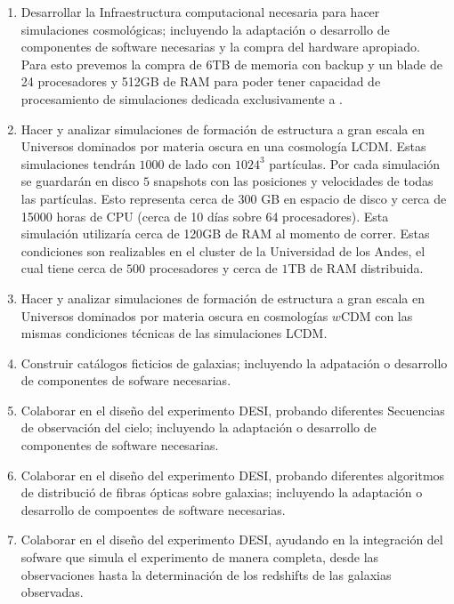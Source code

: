 \begin{enumerate}
\item Desarrollar la Infraestructura computacional necesaria para
  hacer simulaciones cosmol\'ogicas; incluyendo la adaptaci\'on o
  desarrollo de componentes de software necesarias y la compra del
  hardware apropiado. Para esto prevemos la compra de 6TB de memoria
  con backup y un blade de 24 procesadores y 512GB de RAM para poder
  tener capacidad de procesamiento de simulaciones dedicada
  exclusivamente a \coco.  

\item Hacer y analizar simulaciones de formaci\'on de estructura a
  gran escala en Universos dominados por materia oscura en una
  cosmolog\'ia LCDM. Estas simulaciones tendr\'an $1000$ \hMpc de lado
  con $1024^3$ part\'iculas. Por cada simulaci\'on se guardar\'an en
  disco $5$ snapshots con las posiciones y velocidades de todas las
  part\'iculas. Esto representa cerca de $300$ GB en espacio de disco
  y cerca de 15000 horas de CPU (cerca de 10 d\'ias sobre 64
  procesadores). Esta simulaci\'on utilizar\'ia cerca de 120GB de RAM
  al momento de correr. Estas condiciones son realizables en el
  cluster de la Universidad de los Andes, el cual tiene cerca de $500$
  procesadores y cerca de $1$TB de RAM distribuida.

\item Hacer y analizar simulaciones de formaci\'on de estructura a
  gran escala en Universos dominados por materia oscura en
  cosmolog\'ias $w$CDM con las mismas condiciones t\'ecnicas de las
  simulaciones LCDM. 

\item Construir cat\'alogos ficticios de galaxias; incluyendo la
  adpataci\'on o desarrollo de componentes de sofware necesarias.

\item Colaborar en el dise\~no del experimento DESI, probando
  diferentes Secuencias de observaci\'on del cielo;   incluyendo la
  adaptaci\'on o desarrollo de componentes de software necesarias. 

\item Colaborar en el dise\~no del experimento DESI, probando
  diferentes algoritmos de distribuci\'o de fibras \'opticas sobre
  galaxias; incluyendo la adaptaci\'on o desarrollo de compoentes de
  software necesarias. 

\item Colaborar en el dise\~no del experimento DESI, ayudando en la
  integraci\'on del sofware que simula el experimento de manera
  completa, desde las observaciones hasta la determinaci\'on de los
  redshifts de las galaxias observadas.


\end{enumerate}
